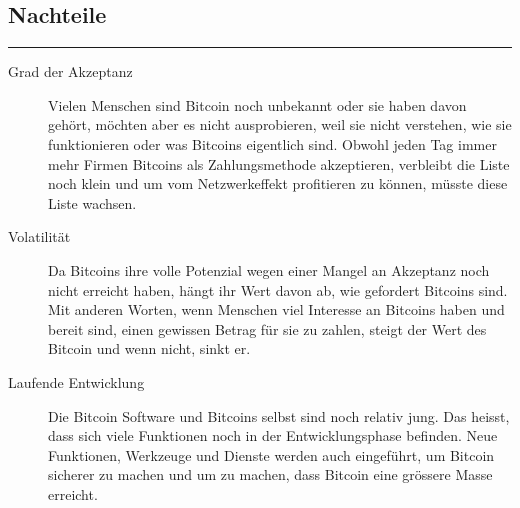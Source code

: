 \subsection*{Nachteile}
\vspace{-10mm}
\noindent\rule{0.8\textwidth}{0.4pt}
\begin{description}
  \item[Grad der Akzeptanz] Vielen Menschen sind Bitcoin noch unbekannt oder sie haben davon
  gehört, möchten aber es nicht ausprobieren, weil sie nicht verstehen, wie sie funktionieren
  oder was Bitcoins eigentlich sind. Obwohl jeden Tag immer mehr Firmen Bitcoins als Zahlungsmethode
  akzeptieren, verbleibt die Liste noch klein und um vom Netzwerkeffekt profitieren zu können, müsste
  diese Liste wachsen.
  \item[Volatilität] Da Bitcoins ihre volle Potenzial wegen einer Mangel an Akzeptanz noch nicht
  erreicht haben, hängt ihr Wert davon ab, wie gefordert Bitcoins sind. Mit anderen Worten, wenn Menschen
  viel Interesse an Bitcoins haben und bereit sind, einen gewissen Betrag für sie zu zahlen, steigt der
  Wert des Bitcoin und wenn nicht, sinkt er.
  \item[Laufende Entwicklung] Die Bitcoin Software und Bitcoins selbst sind noch relativ jung. Das heisst,
  dass sich viele Funktionen noch in der Entwicklungsphase befinden. Neue Funktionen, Werkzeuge und Dienste
  werden auch eingeführt, um Bitcoin sicherer zu machen und um zu machen, dass Bitcoin eine grössere Masse
  erreicht.

\end{description}
